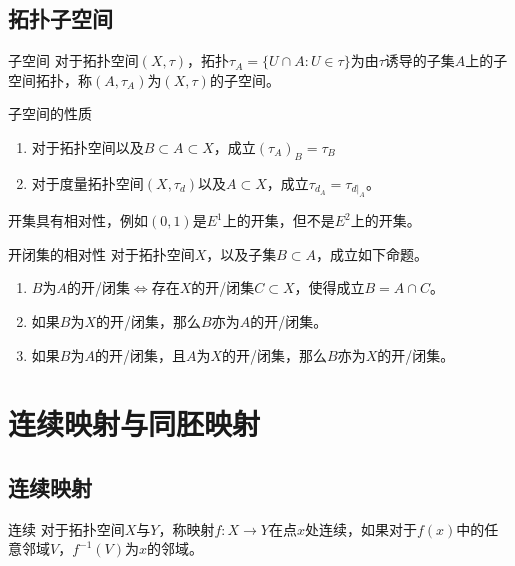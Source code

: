 \documentclass[lang = cn, scheme = chinese, thmcnt = section, usesamecnt]{elegantbook}
\newcommand{\sub}{\subset}             %
\begin{document}
\subsection{拓扑子空间}

\begin{definition}{子空间}
	对于拓扑空间$(X,\tau)$，拓扑$\tau_A=\{ U\cap A:U\in\tau \}$为由$\tau$诱导的子集$A$上的子空间拓扑，称$(A,\tau_A)$为$(X,\tau)$的子空间。
\end{definition}

\begin{proposition}{子空间的性质}
	\begin{enumerate}
		\item 对于拓扑空间以及$B\sub A \sub X$，成立$(\tau_A)_B=\tau_B$
		\item 对于度量拓扑空间$(X,\tau_d)$以及$A\sub X$，成立$\tau_{d_A}=\tau_{d|_A}$。
	\end{enumerate}
\end{proposition}

\begin{remark}
	开集具有相对性，例如$(0,1)$是$E^1$上的开集，但不是$E^2$上的开集。
\end{remark}

\begin{theorem}{开闭集的相对性}
	对于拓扑空间$X$，以及子集$B\sub A$，成立如下命题。
	\begin{enumerate}
		\item $B$为$A$的开/闭集$\iff$存在$X$的开/闭集$C\sub X$，使得成立$B=A\cap C$。
		\item 如果$B$为$X$的开/闭集，那么$B$亦为$A$的开/闭集。
		\item 如果$B$为$A$的开/闭集，且$A$为$X$的开/闭集，那么$B$亦为$X$的开/闭集。
	\end{enumerate}
\end{theorem}

\section{连续映射与同胚映射}

\subsection{连续映射}

\begin{definition}{连续}
	对于拓扑空间$X$与$Y$，称映射$f:X\to Y$在点$x$处连续，如果对于$f(x)$中的任意邻域$V$，$f^{-1}(V)$为$x$的邻域。
\end{definition}
\end{document}
